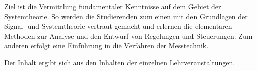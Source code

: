 \begin{module}
\begin{learningoutcomes}
Ziel ist die Vermittlung fundamentaler Kenntnisse auf dem Gebiet der Systemtheorie. So werden die Studierenden zum einen mit den Grundlagen der Signal- und Systemtheorie vertraut gemacht und erlernen die elementaren Methoden zur Analyse und den Entwurf von Regelungen und Steuerungen. Zum anderen erfolgt eine Einführung in die Verfahren der Messtechnik.


\end{learningoutcomes}

\begin{content}
Der Inhalt ergibt sich aus den Inhalten der einzelnen Lehrveranstaltungen.


\end{content}



\end{module}

